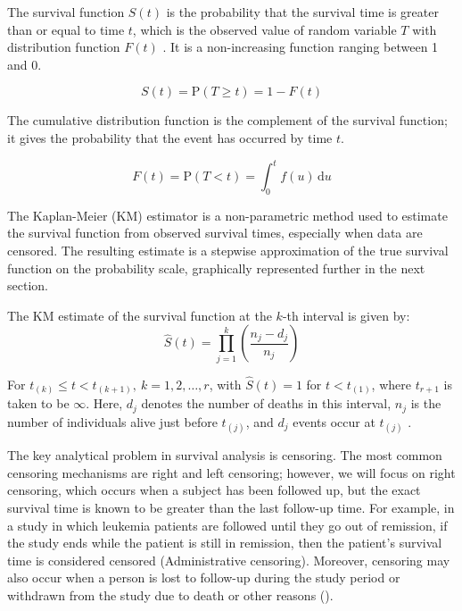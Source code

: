 \documentclass[
  onecolumn]{article}
\begin{document}
The survival function \(S(t)\) is the probability that the survival time
is greater than or equal to time \(t\), which is the observed value of
random variable \(T\) with distribution function \(F(t)\)
\citep{collettModellingSurvivalData2023}. It is a non-increasing
function ranging between 1 and 0.

\begin{equation}
S(t) = \mathrm{P}(T \geqslant t) = 1 - F(t) \label{eq:survival}  
\end{equation}

The cumulative distribution function is the complement of the survival
function; it gives the probability that the event has occurred by time
\(t\).

\begin{equation}
F(t) = \mathrm{P}(T < t) = \int_0^t f(u) \, \mathrm{d}u \label{eq:cumulative}
\end{equation}

The Kaplan-Meier (KM) estimator is a non-parametric method used to
estimate the survival function from observed survival times, especially
when data are censored. The resulting estimate is a stepwise
approximation of the true survival function on the probability scale,
graphically represented further in the next section.

The KM estimate of the survival function at the \(k\)-th interval is
given by: \begin{equation}
\hat{S}(t) = \prod_{j=1}^{k} \left( \frac{n_j - d_j}{n_j} \right) \label{KM estimator}
\end{equation}

For \(t_{(k)} \leqslant t < t_{(k+1)}, \ k = 1, 2, \ldots, r\), with
\(\hat{S}(t) = 1\) for \(t < t_{(1)}\), where \(t_{r+1}\) is taken to be
\(\infty\). Here, \(d_j\) denotes the number of deaths in this interval,
\(n_j\) is the number of individuals alive just before \(t_{(j)}\), and
\(d_j\) events occur at \(t_{(j)}\)
\citep{collettModellingSurvivalData2023}.

The key analytical problem in survival analysis is censoring. The most
common censoring mechanisms are right and left censoring; however, we
will focus on right censoring, which occurs when a subject has been
followed up, but the exact survival time is known to be greater than the
last follow-up time. For example, in a study in which leukemia patients
are followed until they go out of remission, if the study ends while the
patient is still in remission, then the patient's survival time is
considered censored (Administrative censoring). Moreover, censoring may
also occur when a person is lost to follow-up during the study period or
withdrawn from the study due to death or other reasons
(\citet{kleinbaumIntroductionSurvivalAnalysis2012}).
\end{document}
